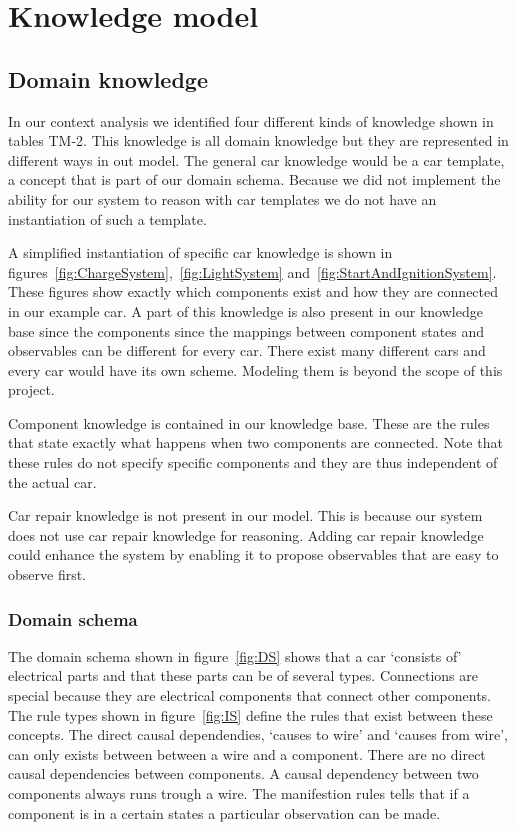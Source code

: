 \section{Knowledge model}


\subsection{Domain knowledge}
In our context analysis we identified four different kinds of knowledge shown in tables TM-2. This knowledge is all domain knowledge but they are represented in different ways in out model. The general car knowledge would be a car template, a concept that is part of our domain schema. Because we did not implement the ability for our system to reason with car templates we do not have an instantiation of such a template.

A simplified instantiation of specific car knowledge is shown in figures~\ref{fig:ChargeSystem},~\ref{fig:LightSystem} and~\ref{fig:StartAndIgnitionSystem}. These figures show exactly which components exist and how they are connected in our example car. A part of this knowledge is also present in our knowledge base since the components since the mappings between component states and observables can be different for every car. There exist many different cars and every car would have its own scheme. Modeling them is beyond the scope of this project.

Component knowledge is contained in our knowledge base. These are the rules that state exactly what happens when two components are connected. Note that these rules do not specify specific components and they are thus independent of the actual car.

Car repair knowledge is not present in our model. This is because our system does not use car repair knowledge for reasoning. Adding car repair knowledge could enhance the system by enabling it to propose observables that are easy to observe first.

\subsubsection{Domain schema}
The domain schema shown in figure~\ref{fig:DS} shows that a car `consists of' electrical parts and that these parts can be of several types. Connections are special because they are electrical components that connect other components. The rule types shown in figure~\ref{fig:IS} define the rules that exist between these concepts.
The direct causal dependendies, `causes to wire' and `causes from wire', can only exists between between a wire and a component.
There are no direct causal dependencies between components.
A causal dependency between two components always runs trough a wire.
The manifestion rules tells that if a component is in a certain states a particular observation can be made.

